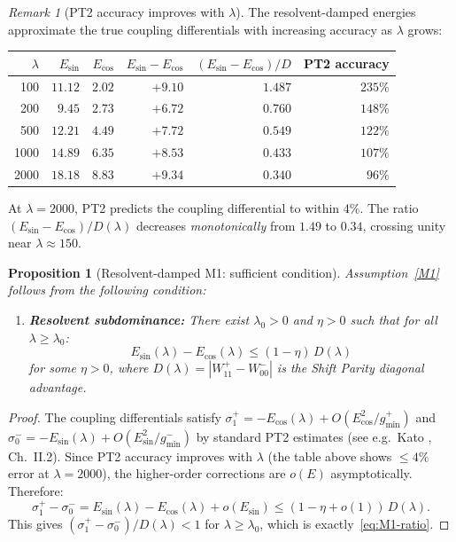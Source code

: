 \documentclass[12pt,a4paper]{article}
\newtheorem{proposition}[theorem]{Proposition}
\theoremstyle{definition}
\theoremstyle{remark}
\newtheorem{remark}[theorem]{Remark}
\begin{document}
\begin{remark}[PT2 accuracy improves with $\lambda$]
The resolvent-damped energies approximate the true coupling differentials with increasing accuracy as $\lambda$ grows:

\begin{center}
\renewcommand{\arraystretch}{1.15}
\begin{tabular}{r|rr|rr|r}
$\lambda$ & $E_{\sin}$ & $E_{\cos}$ & $E_{\sin}-E_{\cos}$ & $(E_{\sin}-E_{\cos})/D$ & PT2 accuracy \\\hline
100  & $11.12$ & $2.02$ & $+9.10$ & $1.487$ & $235\%$ \\
200  & $9.45$  & $2.73$ & $+6.72$ & $0.760$ & $148\%$ \\
500  & $12.21$ & $4.49$ & $+7.72$ & $0.549$ & $122\%$ \\
1000 & $14.89$ & $6.35$ & $+8.53$ & $0.433$ & $107\%$ \\
2000 & $18.18$ & $8.83$ & $+9.34$ & $0.340$ & $96\%$
\end{tabular}
\end{center}

\noindent At $\lambda = 2000$, PT2 predicts the coupling differential to within $4\%$. The ratio $(E_{\sin} - E_{\cos})/D(\lambda)$ decreases \emph{monotonically} from $1.49$ to $0.34$, crossing unity near $\lambda \approx 150$.
\end{remark}

\begin{proposition}[Resolvent-damped M1: sufficient condition]
\label{prop:resolvent-M1}
Assumption~\ref{M1} follows from the following condition:
\begin{enumerate}[label=\textup{(M1$''$)}]
  \item\label{M1pp} \textbf{Resolvent subdominance:} There exist $\lambda_0 > 0$ and $\eta > 0$ such that for all $\lambda \geq \lambda_0$:
  \begin{equation}
  \label{eq:resolvent-subdominance}
    E_{\sin}(\lambda) - E_{\cos}(\lambda) \leq (1 - \eta)\,D(\lambda)
  \end{equation}
  for some $\eta > 0$, where $D(\lambda) = |W_{11}^+ - W_{00}^-|$ is the Shift Parity diagonal advantage.
\end{enumerate}
\end{proposition}

\begin{proof}
The coupling differentials satisfy $\sigma_1^+ = -E_{\cos}(\lambda) + O(E_{\cos}^2/g_{\min}^+)$ and $\sigma_0^- = -E_{\sin}(\lambda) + O(E_{\sin}^2/g_{\min}^-)$ by standard PT2 estimates (see e.g.\ Kato \cite{Kato1995}, Ch.~II.2). Since PT2 accuracy improves with $\lambda$ (the table above shows $\leq 4\%$ error at $\lambda = 2000$), the higher-order corrections are $o(E)$ asymptotically. Therefore:
\[
  \sigma_1^+ - \sigma_0^- = E_{\sin}(\lambda) - E_{\cos}(\lambda) + o(E_{\sin}) \leq (1 - \eta + o(1))\,D(\lambda).
\]
This gives $(\sigma_1^+ - \sigma_0^-)/D(\lambda) < 1$ for $\lambda \geq \lambda_0$, which is exactly~\eqref{eq:M1-ratio}.
\end{proof}
\end{document}
